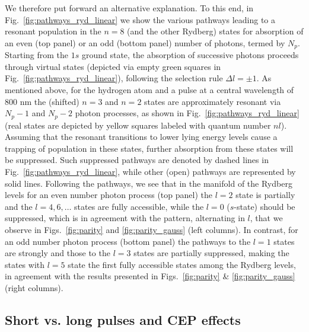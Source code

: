 We therefore put forward an alternative explanation. To this end, in Fig.\ \ref{fig:pathways_ryd_linear} we show the various pathways leading to a resonant population in the $n=8$ (and the other Rydberg) states for absorption of an even (top panel) or an odd (bottom panel) number of photons, termed by $N_p$. Starting from the $1s$ ground state, the absorption of successive photons proceeds through virtual states (depicted via empty green squares in Fig.\ \ref{fig:pathways_ryd_linear}), following the selection rule $\Delta l = \pm 1$. As mentioned above, for the hydrogen atom and a pulse at a central wavelength of 800 nm the (shifted) $n=3$ and $n=2$ states are approximately resonant via $N_p-1$ and $N_p-2$ photon processes, as shown in Fig.\ \ref{fig:pathways_ryd_linear} (real states are depicted by yellow squares labeled with quantum number $nl$). Assuming that the resonant transitions to lower lying energy levels cause a trapping of population in these states, further absorption from these states will be suppressed. Such suppressed pathways are denoted by dashed lines in Fig.\ \ref{fig:pathways_ryd_linear}, while other (open) pathways are represented by solid lines. Following the pathways, we see that in the manifold of the Rydberg levels for an even number photon process (top panel) the $l = 2$ state is partially and the $l = 4, 6, \ldots$ states are fully accessible, while the $l=0$ ($s$-state) should be suppressed, which is in agreement with the pattern, alternating in $l$, that we observe in Figs.\ \ref{fig:parity} and \ref{fig:parity_gauss} (left columns). In contrast, for an odd number photon process (bottom panel) the pathways to the $l=1$ states are strongly and those to the $l=3$ states are partially suppressed, making the states with $l=5$ state the first fully accessible states among the Rydberg levels, in agreement with the results presented in Figs.\ \ref{fig:parity} \& \ref{fig:parity_gauss} (right columns).

\subsection{Short vs. long pulses and CEP effects}
\label{sec:pulse-length}

